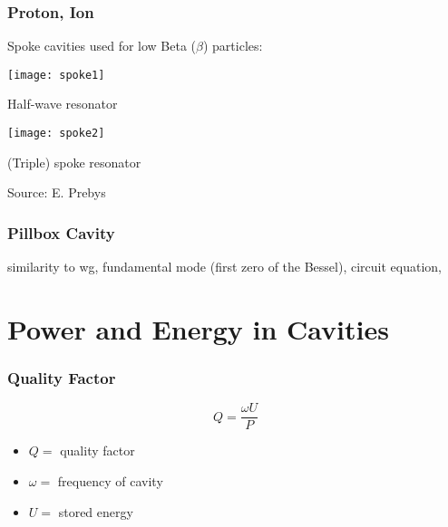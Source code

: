 \documentclass[professionalfonts,t]{beamer}
\begin{document}
\begin{frame}
\frametitle{Proton, Ion}
Spoke cavities used for low Beta ($\beta$) particles:
\vspace{0.25em}

\centering
\begin{minipage}{0.45\textwidth}
	\centering
	\texttt{[image: spoke1]}
	
	Half-wave resonator
\end{minipage}\hspace{-1em}
\begin{minipage}{0.5\textwidth}
	\centering
	\texttt{[image: spoke2]}
	
	(Triple) spoke resonator
\end{minipage}

\vspace{1em}
\hfill Source: E. Prebys
\end{frame}



\begin{frame}
\frametitle{Pillbox Cavity}
similarity to wg, fundamental mode (first zero of the Bessel), 
circuit equation, 
\end{frame}



\section{Power and Energy in Cavities }
\begin{frame}
	\frametitle{Quality Factor}
	\begin{equation}
		Q= \frac{\omega U}{P}
	\end{equation}
	\begin{itemize}
		\item $Q =$ quality factor
		\item $\omega =$ frequency of cavity
		\item $U =$ stored energy
	\end{itemize}
\end{frame}
\end{document}

